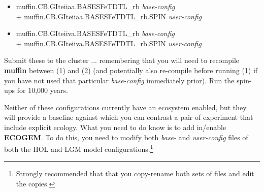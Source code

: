 \documentclass[11pt,fleqn]{book} %
\begin{document}
\vspace{1mm}
\begin{itemize}[noitemsep]
\item[(1)] \textsf{\footnotesize muffin.CB.GIteiiaa.BASESFeTDTL\_rb } \textit{base-config} \\+ \textsf{\footnotesize muffin.CB.GIteiiaa.BASESFeTDTL\_rb.SPIN } \textit{user-config}
\item[(2)] \textsf{\footnotesize muffin.CB.GIteiiva.BASESFeTDTL\_rb } \textit{base-config} \\+ \textsf{\footnotesize muffin.CB.GIteiiva.BASESFeTDTL\_rb.SPIN } \textit{user-config}
\end{itemize}
\vspace{1mm}

\noindent Submit these to the cluster ...  remembering that you will need to recompile \textbf{muffin} between (1) and (2) (and potentially also re-compile before running (1) if you have not  used that particular \textit{base-config} immediately prior). Run the spin-ups for 10,000 years.

Neither of these configurations currently have an ecosystem enabled, but they will provide a baseline against which you can  contrast a pair of experiment that include explicit ecology. What you need to do know is to add in/enable \textbf{ECOGEM}. To do this, you need to modify both \textit{base-} and \textit{user-config} files of both the HOL and LGM model configurations.\footnote{Strongly recommended that that you copy-rename both sets of files and edit the copies.}
\end{document}
